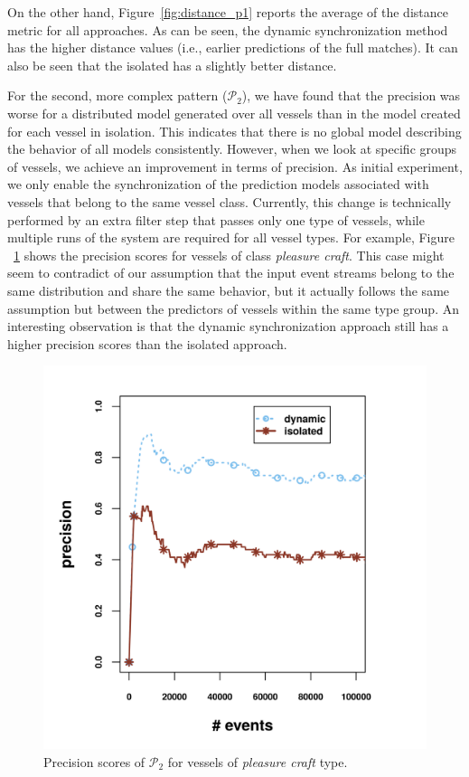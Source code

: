 On the other hand, Figure~\ref{fig:distance_p1} reports the average of the distance metric for all approaches. As can be seen, the dynamic synchronization method has the higher distance values (i.e., earlier predictions of the full matches). It can also be seen that the isolated has a slightly better distance.  


\par For the second, more complex pattern ($\mathcal{P}_2$), we have found that the precision was worse for a distributed model generated over all vessels than in the model created for each vessel in isolation. This indicates that there is no global model describing the behavior of all models consistently. However, when we look at specific groups of vessels, we achieve an improvement in terms of precision. As initial experiment, we only enable the synchronization of the prediction models associated with vessels that belong to the same vessel class. Currently, this change is technically performed by an extra filter step that passes only one type of vessels, while multiple runs of the system are required for all vessel types. For example, Figure ~\ref{fig:precsions_p2} shows the precision scores for vessels of class \textit{pleasure craft}. This case might seem to contradict of our assumption that the input event streams belong to the same distribution and share the same behavior, but it actually follows the same assumption but between the predictors of vessels within the same type group. An interesting observation is that the dynamic synchronization approach still has a higher precision scores than the isolated approach.

\begin{figure}[H]
	\centering
	\includegraphics[width=\textwidth,keepaspectratio]{chapters/figures/synopses/new/precision_p2.png}
	
	\caption{Precision scores of $\mathcal{P}_2$  for vessels of \textit{pleasure craft} type.}
	\label{fig:precsions_p2}
\end{figure}

